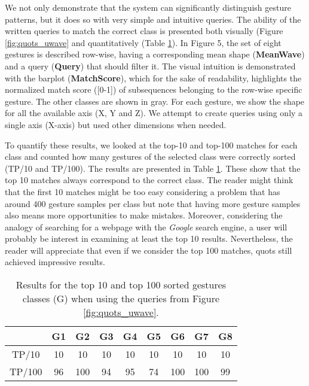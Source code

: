 We not only demonstrate that the system can significantly distinguish gesture patterns, but it does so with very simple and intuitive queries. The ability of the written queries to match the correct class is presented both visually (Figure \ref{fig:quots_uwave} and quantitatively (Table \ref{tab:quots_exp1}). In Figure 5, the set of eight gestures is described row-wise, having a corresponding mean shape (\textbf{MeanWave}) and a query (\textbf{Query}) that should filter it. The visual intuition is demonstrated with the barplot (\textbf{MatchScore}), which for the sake of readability, highlights the normalized match score ([0-1]) of subsequences belonging to the row-wise specific gesture. The other classes are shown in gray. For each gesture, we show the shape for all the available axis (X, Y and Z). We attempt to create queries using only a single axis (X-axis) but used other dimensions when needed.
\par
To quantify these results, we looked at the top-10 and top-100 matches for each class and counted how many gestures of the selected class were correctly sorted (TP/10 and TP/100). The results are presented in Table \ref{tab:quots_exp1}. These show that the top 10 matches always correspond to the correct class. The reader might think that the first 10 matches might be too easy considering a problem that has around 400 gesture samples per class but note that having more gesture samples also means more opportunities to make mistakes. Moreover, considering the analogy of searching for a webpage with the \textit{Google} search engine, a user will probably be interest in examining at least the top 10 results. Nevertheless, the reader will appreciate that even if we consider the top 100 matches, \gls{quots} still achieved impressive results.

\begin{table}
\centering
\begin{tabular}{ccccccccc}
\toprule[1.5pt]
& G1 & G2 & G3 & G4 & G5 & G6 & G7 & G8\\
\midrule
TP/10 & 10 & 10 & 10 & 10 & 10 & 10 & 10 & 10\\
TP/100 & 96 & 100 & 94 & 95 & 74 & 100 & 100 & 99\\
\bottomrule[1.5pt]
\end{tabular}
\caption{Results for the top 10 and top 100 sorted gestures classes  (G) when using the queries from Figure \ref{fig:quots_uwave}.}
\label{tab:quots_exp1}
\end{table}

